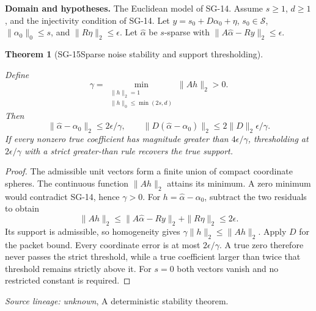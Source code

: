 \documentclass[11pt]{article}
\newtheorem{theorem}{Theorem}[section]
\theoremstyle{definition}\newtheorem{definition}[theorem]{Definition}
\theoremstyle{remark}\newtheorem{remark}[theorem]{Remark}
\begin{document}
\par{\small\textbf{Domain and hypotheses.} The Euclidean model of SG-14. Assume $s\ge1$, $d\ge1$, and the injectivity condition of SG-14. Let $y=s_0+D\alpha_0+\eta$, $s_0\in\mathcal S$, $\|\alpha_0\|_0\le s$, and $\|R\eta\|_2\le\epsilon$. Let $\widehat\alpha$ be $s$-sparse with $\|A\widehat\alpha-Ry\|_2\le\epsilon$.}\par
\begin{theorem}[SG-15\quad Sparse noise stability and support thresholding]\label{SG-15}

Define
\[
 \gamma=\min_{\substack{\|h\|_2=1\\\|h\|_0\le\min(2s,d)}}\|Ah\|_2>0.
\]
Then
\[
 \|\widehat\alpha-\alpha_0\|_2\le2\epsilon/\gamma,
 \qquad\|D(\widehat\alpha-\alpha_0)\|_2
 \le2\|D\|_2\epsilon/\gamma.
\]
If every nonzero true coefficient has magnitude greater than $4\epsilon/\gamma$,
thresholding at $2\epsilon/\gamma$ with a strict greater-than rule recovers
the true support.

\end{theorem}
\begin{proof}

The admissible unit vectors form a finite union of compact coordinate
spheres. The continuous function $\|Ah\|_2$ attains its minimum. A zero
minimum would contradict SG-14, hence $\gamma>0$.
For $h=\widehat\alpha-\alpha_0$, subtract the two residuals to obtain
\[
 \|Ah\|_2\le\|A\widehat\alpha-Ry\|_2+\|R\eta\|_2\le2\epsilon.
\]
Its support is admissible, so homogeneity gives
$\gamma\|h\|_2\le\|Ah\|_2$. Apply $D$ for the packet bound.
Every coordinate error is at most $2\epsilon/\gamma$. A true zero therefore
never passes the strict threshold, while a true coefficient larger than twice
that threshold remains strictly above it. For $s=0$ both vectors vanish and
no restricted constant is required.

\end{proof}

\par{\small\color{Teal}\textit{Source lineage:} \textit{unknown}, A deterministic stability theorem.}\par
\end{document}
